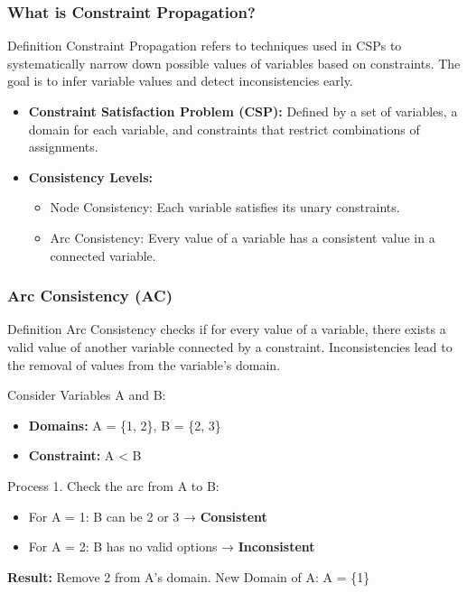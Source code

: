 \documentclass[aspectratio=169]{beamer}
\begin{document}
\begin{frame}[fragile]
    \frametitle{What is Constraint Propagation?}
    \begin{block}{Definition}
        Constraint Propagation refers to techniques used in CSPs to systematically narrow down possible values of variables based on constraints. The goal is to infer variable values and detect inconsistencies early.
    \end{block}
    
    \begin{itemize}
        \item \textbf{Constraint Satisfaction Problem (CSP):} Defined by a set of variables, a domain for each variable, and constraints that restrict combinations of assignments.
        \item \textbf{Consistency Levels:}
            \begin{itemize}
                \item Node Consistency: Each variable satisfies its unary constraints.
                \item Arc Consistency: Every value of a variable has a consistent value in a connected variable.
            \end{itemize}
    \end{itemize}
\end{frame}

\begin{frame}[fragile]
    \frametitle{Arc Consistency (AC)}
    \begin{block}{Definition}
        Arc Consistency checks if for every value of a variable, there exists a valid value of another variable connected by a constraint. Inconsistencies lead to the removal of values from the variable's domain.
    \end{block}
    
    \begin{example}
        Consider Variables A and B:
        \begin{itemize}
            \item \textbf{Domains:} A = \{1, 2\}, B = \{2, 3\}
            \item \textbf{Constraint:} A < B
        \end{itemize}
    \end{example}

    \begin{block}{Process}
        1. Check the arc from A to B:
        \begin{itemize}
            \item For A = 1: B can be 2 or 3 → \textbf{Consistent}
            \item For A = 2: B has no valid options → \textbf{Inconsistent}
        \end{itemize}
        \textbf{Result:} Remove 2 from A's domain. New Domain of A: A = \{1\}
    \end{block}
\end{frame}
\end{document}
